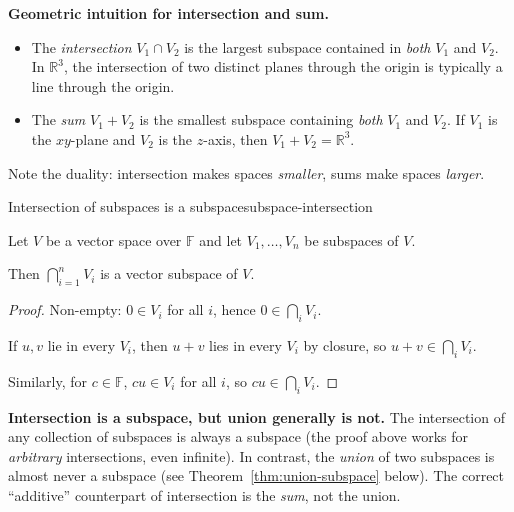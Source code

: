 \begin{policynote}
\textbf{Geometric intuition for intersection and sum.}
\begin{itemize}[leftmargin=*]
\item The \emph{intersection} $V_1\cap V_2$ is the largest subspace contained in \emph{both} $V_1$ and $V_2$.  In $\mathbb{R}^3$, the intersection of two distinct planes through the origin is typically a line through the origin.
\item The \emph{sum} $V_1+V_2$ is the smallest subspace containing \emph{both} $V_1$ and $V_2$.  If $V_1$ is the $xy$-plane and $V_2$ is the $z$-axis, then $V_1+V_2=\mathbb{R}^3$.
\end{itemize}
Note the duality: intersection makes spaces \emph{smaller}, sums make spaces \emph{larger}.
\end{policynote}

\begin{theorem}{Intersection of subspaces is a subspace}{subspace-intersection}

Let $V$ be a vector space over $\mathbb{F}$ and let $V_1,\dots,V_n$ be subspaces of $V$.

Then $\bigcap_{i=1}^n V_i$ is a vector subspace of $V$.

\end{theorem}

\begin{proof}

Non-empty: $0\in V_i$ for all $i$, hence $0\in \bigcap_i V_i$.

If $u,v$ lie in every $V_i$, then $u+v$ lies in every $V_i$ by closure, so $u+v\in \bigcap_i V_i$.

Similarly, for $c\in\mathbb{F}$, $cu\in V_i$ for all $i$, so $cu\in \bigcap_i V_i$.

\end{proof}

\begin{commonmistake}
\textbf{Intersection is a subspace, but union generally is not.}
The intersection of any collection of subspaces is always a subspace (the proof above works for \emph{arbitrary} intersections, even infinite).
In contrast, the \emph{union} of two subspaces is almost never a subspace (see Theorem~\ref{thm:union-subspace} below).
The correct ``additive'' counterpart of intersection is the \emph{sum}, not the union.
\end{commonmistake}

